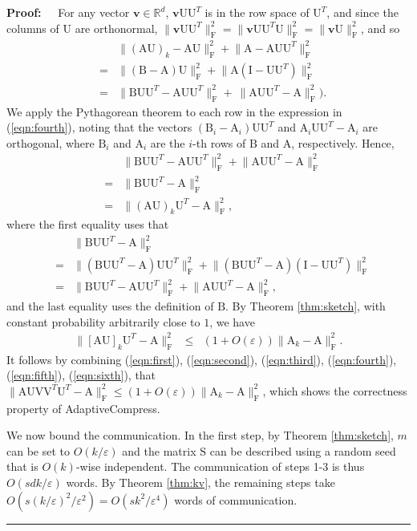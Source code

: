 \documentclass[11pt]{article}
\newcommand{\FNormS}[1]{\mbox{}\|#1\|_\mathrm{F}^2}
\newenvironment{proof}{\begin{trivlist} \item {\bf Proof:~~}}
  {\qed\end{trivlist}}
\newcommand{\mat}[1]{{\ensuremath{\bm{\mathrm{#1}}}}}
\def\ve{{\mathbf v}}
\def\matA{\mat{A}}
\def\matB{\mat{B}}
\def\matI{\mat{I}}
\def\matS{\mat{S}}
\def\matU{\mat{U}}
\def\matV{\mat{V}}
\def\qed{\hfill\rule{2mm}{2mm}}
\newcommand{\eps}{\varepsilon}
\begin{document}
\begin{proof}
For any vector $\ve \in \mathbb{R}^d$, $\ve\matU\matU^T$ is in the row space of $\matU^T$, and since the columns of $\matU$ are orthonormal, 
$\FNormS{\ve\matU\matU^T} = \FNormS{\ve\matU\matU^T\matU} = \FNormS{\ve\matU}$,
and so 
\begin{eqnarray}\label{eqn:fourth}
&& \FNormS{(\matA\matU)_k - \matA\matU} + \FNormS{\matA-\matA\matU\matU^T} \nonumber \\
& = & \FNormS{(\matB -\matA)\matU} + \FNormS{\matA(\matI-\matU\matU^T)} \nonumber \\
& = & \FNormS{\matB\matU\matU^T - \matA\matU\matU^T} + \ \FNormS{\matA\matU\matU^T - \matA}).
\end{eqnarray}
We apply the Pythagorean theorem to each row in the expression in (\ref{eqn:fourth}), noting that
the vectors $(\matB_i-\matA_i)\matU\matU^T$ and $\matA_i\matU\matU^T-\matA_i$ are orthogonal, where $\matB_i$ and $\matA_i$ are the $i$-th rows of $\matB$ and $\matA$,
respectively. Hence,
\begin{eqnarray}\label{eqn:fifth}
&& \FNormS{\matB\matU\matU^T - \matA\matU\matU^T} + \FNormS{\matA\matU\matU^T - \matA}\\
& = & \FNormS{\matB\matU\matU^T - \matA}\\
& = & \FNormS{(\matA\matU)_k \matU^T - \matA},
\end{eqnarray}
where the first equality uses that
\begin{eqnarray*}
&& \FNormS{\matB\matU\matU^T-\matA} \nonumber \\
& = & \FNormS{(\matB\matU\matU^T-\matA)\matU\matU^T} + \FNormS{(\matB\matU\matU^T-\matA)(\matI-\matU\matU^T)}\\
& = & \FNormS{\matB\matU\matU^T - \matA\matU\matU^T} + \FNormS{\matA\matU\matU^T - \matA},
\end{eqnarray*}
and 
the last equality uses the definition of $\matB$. By Theorem \ref{thm:sketch},
with constant probability arbitrarily close to $1$, we have
\begin{eqnarray}\label{eqn:sixth}
\FNormS{[\matA\matU]_k \matU^T - \matA} & \leq & (1+O(\eps)) \FNormS{\matA_k - \matA}.
\end{eqnarray}
It follows by combining (\ref{eqn:first}), (\ref{eqn:second}), (\ref{eqn:third}), (\ref{eqn:fourth}), (\ref{eqn:fifth}),
(\ref{eqn:sixth}),
that $\FNormS{\matA\matU \matV \matV^T \matU^T - \matA} \leq (1+O(\eps))\FNormS{\matA_k-\matA}$, 
which shows the correctness property of {\sc AdaptiveCompress}.

We now bound the communication. In the first step, by Theorem \ref{thm:sketch}, $m$ can be set to $O(k/\eps)$
and the matrix $\matS$ can be described using a random seed that is $O(k)$-wise independent. The communication of
steps 1-3 is thus $O(sdk / \eps)$ words. By Theorem \ref{thm:kv}, the remaining steps take $O(s(k/\eps)^2/\eps^2) =
O(sk^2/\eps^4)$ words of communication.


\end{proof}
\end{document}

